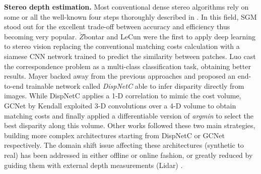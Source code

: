 \documentclass[10pt,twocolumn,letterpaper]{article}
\begin{document}
\textbf{Stereo depth estimation.}
Most conventional dense stereo algorithms rely on some or all the well-known four steps thoroughly described in \cite{scharstein2002taxonomy}. In this field, SGM \cite{hirschmuller2005accurate} stood out for the excellent trade-off between accuracy and efficiency thus becoming very popular.   
$\breve{Z}$bontar and LeCun \cite{zbontar2016stereo} were the first to apply deep learning to stereo vision replacing the conventional matching costs calculation with a siamese CNN network trained to predict the similarity between patches. Luo \etal \cite{luo2016efficient} cast the correspondence problem as a multi-class classification task, obtaining better results. Mayer \etal \cite{Mayer_2016_CVPR} backed away from the previous approaches and proposed an end-to-end trainable network called \textit{DispNetC} able to infer disparity directly from images. While DispNetC applies a 1-D correlation to mimic the cost volume, GCNet by Kendall \etal \cite{Kendall_2017_ICCV} exploited 3-D convolutions over a 4-D volume to obtain matching costs and finally applied a differentiable version of \textit{argmin} to select the best disparity along this volume. Other works followed these two main strategies, building more complex architectures starting from DispNetC \cite{Pang_2017_ICCV_Workshops,Liang_2018_CVPR,yang2018segstereo,song2018stereo} or GCNet \cite{Chang_2018_CVPR,yu2018kandao,khamis2018stereonet} respectively. The domain shift issue affecting these architectures (\eg synthetic to real) has been addressed in either offline \cite{Tonioni_2017_ICCV} or online \cite{Tonioni_2019_CVPR} fashion, or greatly reduced by guiding them with external depth measurements (\eg Lidar) \cite{POGGI_2019_CVPR}.
\end{document}

